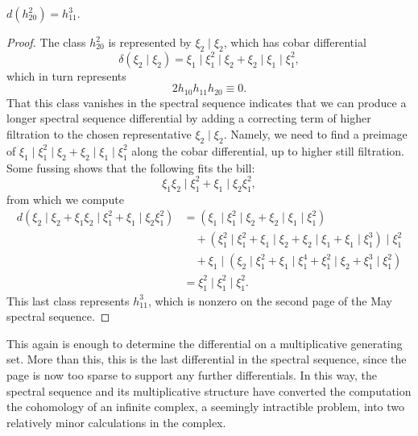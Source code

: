 \begin{subappendices}
\begin{lemma}
$d(h_{20}^2) = h_{11}^3$.
\end{lemma}
\begin{proof}
The class $h_{20}^2$ is represented by $\xi_2 \mid \xi_2$, which has cobar differential \[\delta(\xi_2 \mid \xi_2) = \xi_1 \mid \xi_1^2 \mid \xi_2 + \xi_2 \mid \xi_1 \mid \xi_1^2,\] which in turn represents \[2 h_{10} h_{11} h_{20} \equiv 0.\]
That this class vanishes in the spectral sequence indicates that we can produce a longer spectral sequence differential by adding a correcting term of higher filtration to the chosen representative $\xi_2 \mid \xi_2$.
Namely, we need to find a preimage of $\xi_1 \mid \xi_1^2 \mid \xi_2 + \xi_2 \mid \xi_1 \mid \xi_1^2$ along the cobar differential, up to higher still filtration.
Some fussing shows that the following fits the bill: \[\xi_1 \xi_2 \mid \xi_1^2 + \xi_1 \mid \xi_2 \xi_1^2,\] from which we compute
\begin{align*}
d(\xi_2 \mid \xi_2 + \xi_1 \xi_2 \mid \xi_1^2 + \xi_1 \mid \xi_2 \xi_1^2)
&       = (\xi_1 \mid \xi_1^2 \mid \xi_2 + \xi_2 \mid \xi_1 \mid \xi_1^2) \\
& \quad + (\xi_1^2 \mid \xi_1^2 + \xi_1 \mid \xi_2 + \xi_2 \mid \xi_1 + \xi_1 \mid \xi_1^3) \mid \xi_1^2 \\
& \quad + \xi_1 \mid (\xi_2 \mid \xi_1^2 + \xi_1 \mid \xi_1^4 + \xi_1^2 \mid \xi_2 + \xi_1^3 \mid \xi_1^2) \\
& = \xi_1^2 \mid \xi_1^2 \mid \xi_1^2.
\end{align*}
This last class represents $h_{11}^3$, which is nonzero on the second page of the May spectral sequence.
\end{proof}

\noindent
{}
This again is enough to determine the differential on a multiplicative generating set.
More than this, this is the last differential in the spectral sequence, since the page is now too sparse to support any further differentials.
In this way, the spectral sequence and its multiplicative structure have converted the computation the cohomology of an infinite complex, a seemingly intractible problem, into two relatively minor calculations in the complex.


\end{subappendices}
